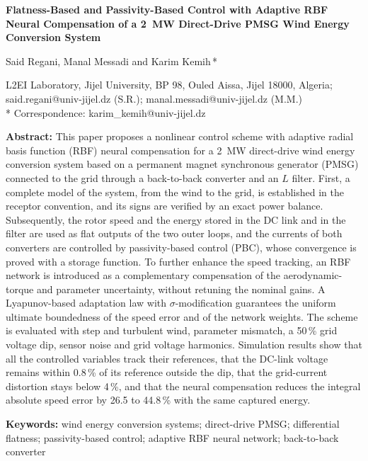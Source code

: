\documentclass[11pt,a4paper]{article}
\begin{document}
\begin{center}
{\LARGE\bfseries Flatness-Based and Passivity-Based Control with Adaptive RBF Neural Compensation of a 2~MW Direct-Drive PMSG Wind Energy Conversion System\par}
\vspace{12pt}
{\large Said Regani, Manal Messadi and Karim Kemih\,*\par}
\vspace{6pt}
{\small L2EI Laboratory, Jijel University, BP 98, Ouled Aissa, Jijel 18000, Algeria;\\
said.regani@univ-jijel.dz (S.R.); manal.messadi@univ-jijel.dz (M.M.)\\
* Correspondence: karim\_kemih@univ-jijel.dz\par}
\end{center}

\vspace{6pt}
\noindent\textbf{Abstract:} This paper proposes a nonlinear control scheme with adaptive radial basis function (RBF)
neural compensation for a 2~MW direct-drive wind energy conversion system based on a permanent magnet
synchronous generator (PMSG) connected to the grid through a back-to-back converter and an $L$ filter.
First, a complete model of the system, from the wind to the grid, is established in the receptor
convention, and its signs are verified by an exact power balance. Subsequently, the rotor speed and the
energy stored in the DC link and in the filter are used as flat outputs of the two outer loops, and the
currents of both converters are controlled by passivity-based control (PBC), whose convergence is proved
with a storage function. To further enhance the speed tracking, an RBF network is introduced as a
complementary compensation of the aerodynamic-torque and parameter uncertainty, without retuning the
nominal gains. A Lyapunov-based adaptation law with $\sigma$-modification guarantees the uniform
ultimate boundedness of the speed error and of the network weights. The scheme is evaluated with step
and turbulent wind, parameter mismatch, a 50\,\% grid voltage dip, sensor noise and grid voltage
harmonics. Simulation results show that all the controlled variables track their references, that the
DC-link voltage remains within 0.8\,\% of its reference outside the dip, that the grid-current
distortion stays below 4\,\%, and that the neural compensation reduces the integral absolute speed error
by 26.5 to 44.8\,\% with the same captured energy.

\vspace{4pt}
\noindent\textbf{Keywords:} wind energy conversion systems; direct-drive PMSG; differential flatness;
passivity-based control; adaptive RBF neural network; back-to-back converter
\end{document}
